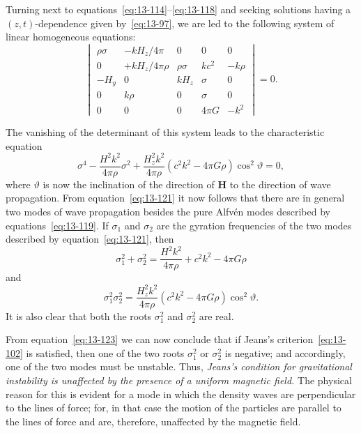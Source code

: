 Turning next to equations~\eqref{eq:13-114}--\eqref{eq:13-118} and seeking solutions having a $(z,t)$-dependence given by~\eqref{eq:13-97}, we are led to the following system of linear homogeneous equations:
\begin{equation}
\label{eq:13-120}
\begin{vmatrix}
\rho\sigma & -kH_z/4\pi & 0 & 0 & 0 \\
0 & +kH_z/4\pi\rho & \rho\sigma & kc^2 & -k\rho \\
-H_y & 0 & kH_z & \sigma & 0 \\
0 & k\rho & 0 & \sigma & 0 \\
0 & 0 & 0 & 4\pi G & -k^2
\end{vmatrix}
= 0.
\end{equation}

The vanishing of the determinant of this system leads to the characteristic equation
\begin{equation}
\label{eq:13-121}
\sigma^4 - \frac{H^2k^2}{4\pi\rho}\sigma^2 + \frac{H_z^2k^2}{4\pi\rho}(c^2k^2-4\pi G\rho)\cos^2\!\vartheta = 0,
\end{equation}
where $\vartheta$ is now the inclination of the direction of $\mathbf{H}$ to the direction of wave propagation. From equation~\eqref{eq:13-121} it now follows that there are in general two modes of wave propagation besides the pure Alfv\'en modes described by equations~\eqref{eq:13-119}. If $\sigma_1$ and $\sigma_2$ are the gyration frequencies of the two modes described by equation~\eqref{eq:13-121}, then
\begin{equation}
\label{eq:13-122}
\sigma_1^2+\sigma_2^2 = \frac{H^2k^2}{4\pi\rho} + c^2k^2 - 4\pi G\rho
\end{equation}
and
\begin{equation}
\label{eq:13-123}
\sigma_1^2\sigma_2^2 = \frac{H_z^2k^2}{4\pi\rho}(c^2k^2-4\pi G\rho)\cos^2\!\vartheta.
\end{equation}
It is also clear that both the roots $\sigma_1^2$ and $\sigma_2^2$ are real.

From equation~\eqref{eq:13-123} we can now conclude that if Jeans's criterion~\eqref{eq:13-102} is satisfied, then one of the two roots $\sigma_1^2$ or $\sigma_2^2$ is negative; and accordingly, one of the two modes must be unstable. Thus, \textit{Jeans's condition for gravitational instability is unaffected by the presence of a uniform magnetic field.} The physical reason for this is evident for a mode in which the density waves are perpendicular to the lines of force; for, in that case the motion of the particles are parallel to the lines of force and are, therefore, unaffected by the magnetic field.

